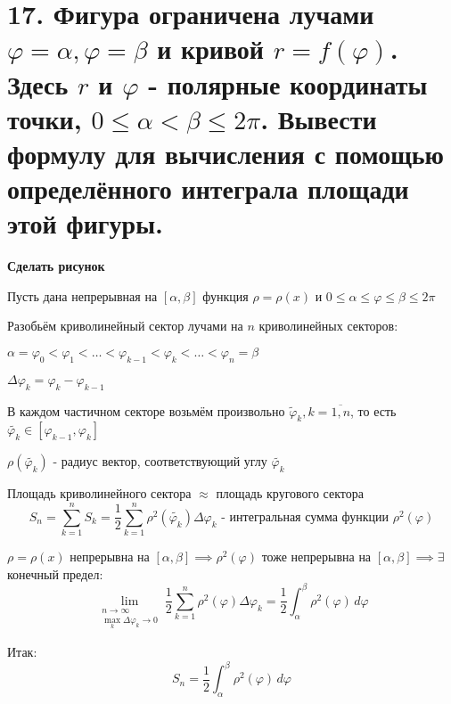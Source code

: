 \documentclass[11pt]{article}
\begin{document}
\section*{17. Фигура ограничена лучами $\varphi = \alpha, \varphi = \beta$ и кривой $r = f(\varphi)$. Здесь $r$ и $\varphi$ - полярные координаты точки, $0 \leq \alpha < \beta \leq 2 \pi$. Вывести формулу для вычисления с помощью определённого интеграла площади этой фигуры.}
\par\textbf{Сделать рисунок}
\par Пусть дана непрерывная на $[\alpha, \beta]$ функция  $\rho = \rho(x)$ и $0 \leq \alpha \leq \varphi \leq \beta \leq 2\pi$
\par Разобьём криволинейный сектор лучами на $n$ криволинейных секторов:
\par $\alpha = \varphi_{0} < \varphi_{1} < \dots < \varphi_{k-1} < \varphi_{k} < \dots < \varphi_{n} = \beta$
\par $\Delta \varphi_{k} = \varphi_{k} - \varphi_{k-1}$
\par В каждом частичном секторе возьмём произвольно $\tilde\varphi_{k}, k = \overline{1, n}$, то есть $\tilde{\varphi_{k}} \in [\varphi_{k-1}, \varphi_{k}]$
\par $\rho(\tilde{\varphi_{k}})$ - радиус вектор, соответствующий углу $\tilde{\varphi_{k}}$
\par Площадь криволинейного сектора $\approx$ площадь кругового сектора
$$S_{n} = \sum_{k=1}^n S_{k} = \frac{1}{2} \sum_{k=1}^n \rho^2(\tilde{\varphi_{k}}) \Delta \varphi_{k} \text{ - интегральная сумма функции } \rho^2(\varphi)$$
\par $\rho = \rho(x)$ непрерывна на $[\alpha, \beta] \implies \rho^2(\varphi)$ тоже непрерывна на $[\alpha, \beta] \implies \exists$ конечный предел:$$\lim_{\substack{n \to \infty \\ \max_{k} \Delta \varphi_{k} \to 0}} \frac{1}{2} \sum_{k=1}^n \rho^2(\varphi) \Delta \varphi_{k} = \frac{1}{2} \int_{\alpha}^{\beta} \rho^2(\varphi)\, d\varphi$$
\par Итак:$$S_{n} = \frac{1}{2} \int_{\alpha}^{\beta} \rho^2(\varphi)\, d\varphi$$
\end{document}
